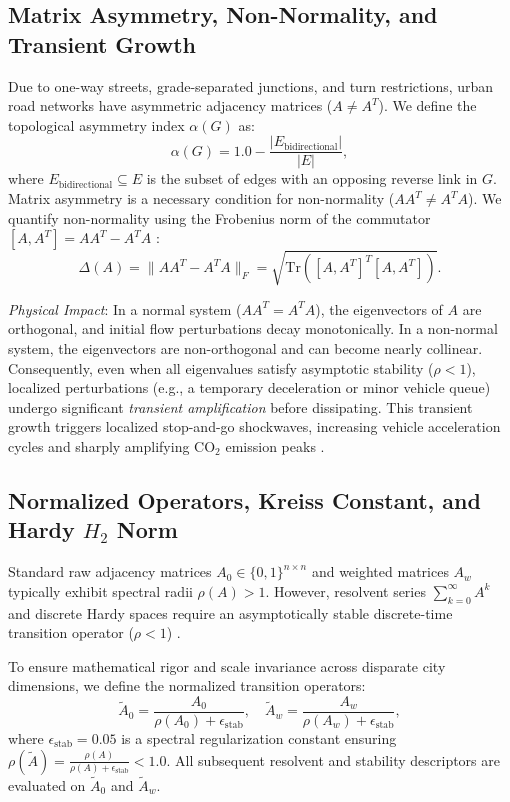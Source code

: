 \documentclass[journal]{IEEEtran}
\begin{document}
\subsection{Matrix Asymmetry, Non-Normality, and Transient Growth}
Due to one-way streets, grade-separated junctions, and turn restrictions, urban road networks have asymmetric adjacency matrices ($A \neq A^T$). We define the topological asymmetry index $\alpha(G)$ as:
\begin{equation}
\alpha(G) = 1.0 - \frac{|E_{\text{bidirectional}}|}{|E|},
\end{equation}
where $E_{\text{bidirectional}} \subseteq E$ is the subset of edges with an opposing reverse link in $G$. Matrix asymmetry is a necessary condition for non-normality ($A A^T \neq A^T A$). We quantify non-normality using the Frobenius norm of the commutator $[A, A^T] = A A^T - A^T A$ \cite{Schur1909, Henrici1962}:
\begin{equation}
\Delta(A) = \| A A^T - A^T A \|_F = \sqrt{\text{Tr}\left( [A, A^T]^T [A, A^T] \right)}.
\end{equation}

\textit{Physical Impact}: In a normal system ($A A^T = A^T A$), the eigenvectors of $A$ are orthogonal, and initial flow perturbations decay monotonically. In a non-normal system, the eigenvectors are non-orthogonal and can become nearly collinear. Consequently, even when all eigenvalues satisfy asymptotic stability ($\rho < 1$), localized perturbations (e.g., a temporary deceleration or minor vehicle queue) undergo significant \emph{transient amplification} before dissipating. This transient growth triggers localized stop-and-go shockwaves, increasing vehicle acceleration cycles and sharply amplifying $\text{CO}_2$ emission peaks \cite{Trefethen2005, Whitham2011, Kerner2009}.

\subsection{Normalized Operators, Kreiss Constant, and Hardy $H_2$ Norm}
Standard raw adjacency matrices $A_0 \in \{0, 1\}^{n \times n}$ and weighted matrices $A_w$ typically exhibit spectral radii $\rho(A) > 1$. However, resolvent series $\sum_{k=0}^\infty A^k$ and discrete Hardy spaces require an asymptotically stable discrete-time transition operator ($\rho < 1$) \cite{Kreiss1962, Zhou1996}.

To ensure mathematical rigor and scale invariance across disparate city dimensions, we define the normalized transition operators:
\begin{equation}
\tilde{A}_0 = \frac{A_0}{\rho(A_0) + \epsilon_{\text{stab}}}, \quad \tilde{A}_w = \frac{A_w}{\rho(A_w) + \epsilon_{\text{stab}}},
\label{eq:normalized_operators}
\end{equation}
where $\epsilon_{\text{stab}} = 0.05$ is a spectral regularization constant ensuring $\rho(\tilde{A}) = \frac{\rho(A)}{\rho(A) + \epsilon_{\text{stab}}} < 1.0$. All subsequent resolvent and stability descriptors are evaluated on $\tilde{A}_0$ and $\tilde{A}_w$.
\end{document}
